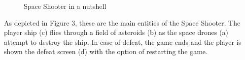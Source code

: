 \begin{figure}
\begin{subfigure}{0.49\textwidth}
\label{fig:right}
\end{subfigure}
\caption{Space Shooter in a nutshell}
\label{fig:combined}
\end{figure}
As depicted in Figure 3, these are the main entities of the Space Shooter. The player ship (c) flies through a field of asteroids (b) as the space drones (a) attempt to destroy the ship. In case of defeat, the game ends and the player is shown the defeat screen (d) with the option of restarting the game.